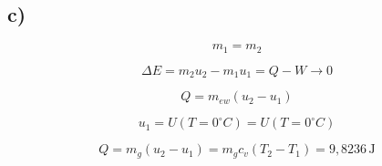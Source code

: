 

\subsection*{c)}

\[
m_1 = m_2
\]

\[
\Delta E = m_2 u_2 - m_1 u_1 = Q - W \rightarrow 0
\]

\[
Q = m_{ew} (u_2 - u_1)
\]

\[
u_1 = U(T=0^\circ C) = U(T=0^\circ C)
\]

\[
Q = m_g (u_2 - u_1) = m_g c_v (T_2 - T_1) = 9,8236 \, \text{J}
\]